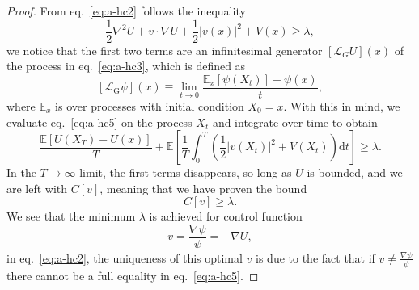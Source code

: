 \begin{proof}
	From eq.~\eqref{eq:a-hc2} follows the inequality
	\begin{equation}
		\label{eq:a-hc5}
		\frac{1}{2} \nabla^{2} U+v \cdot \nabla U+\frac{1}{2}|v(x)|^{2}+V(x) \geq \lambda,
	\end{equation}
	we notice that the first two terms are an infinitesimal generator $[\mathcal{L}_G U](x)$ of the process in eq.~\eqref{eq:a-hc3}, which is defined as
	\begin{equation}
		\left[\mathcal{L}_{\mathrm{G}} \psi\right](x) \equiv \lim _{t \rightarrow 0} \frac{\mathbb{E}_{x}\left[\psi\left(X_{t}\right)\right]-\psi(x)}{t},
	\end{equation} 
	where $\mathbb{E}_x$ is over processes with initial condition $X_0 = x$.
	With this in mind, we evaluate eq.~\eqref{eq:a-hc5} on the process $X_t$ and integrate over time to obtain
	\begin{equation}
		\frac{\mathbb{E}\left[U\left(X_{T}\right)-U(x)\right]}{T}+\mathbb{E}\left[\frac{1}{T}\int_{0}^{T} \left(\frac{1}{2}\left|v\left(X_{t}\right)\right|^{2}+V\left(X_{t}\right)\right)\mathrm dt\right] \geq \lambda.
	\end{equation}
	In the $T \rightarrow \infty$ limit, the first terms disappears, so long as $U$ is bounded, and we are left with $C[v]$, meaning that we have proven the bound 
	\begin{equation}
		C[v] \geq \lambda.
	\end{equation}
	We see that the minimum $\lambda$ is achieved for control function
	\begin{equation}
		v = \frac{\nabla \psi}{\psi} = -\nabla U,
	\end{equation}
	in eq.~\eqref{eq:a-hc2}, the uniqueness of this optimal $v$ is due to the fact that if $v \neq \frac{\nabla \psi}{\psi}$ there cannot be a full equality in eq.~\eqref{eq:a-hc5}.
\end{proof}


